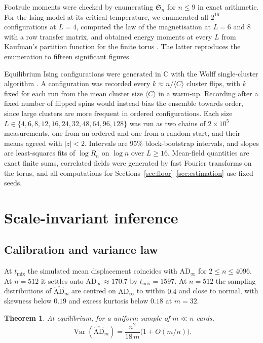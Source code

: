 \documentclass[ba,preprint]{imsart}
\theoremstyle{plain}
\newtheorem{theorem}{Theorem}[section]
\theoremstyle{definition}
\newcommand{\Var}{\operatorname{Var}}
\newcommand{\AD}{\mathrm{AD}}
\newcommand{\ADh}{\widehat{\mathrm{AD}}}
\newcommand{\Sym}{\mathfrak{S}}
\begin{document}
Footrule moments were checked by enumerating $\Sym_n$ for $n\le9$ in exact arithmetic. For the Ising model at its critical temperature, we enumerated all $2^{16}$ configurations at $L=4$, computed the law of the magnetisation at $L=6$ and $8$ with a row transfer matrix, and obtained energy moments at every $L$ from Kaufman's partition function for the finite torus \citep{FerdinandFisher1969,Kaufman1949}. The latter reproduces the enumeration to fifteen significant figures.

Equilibrium Ising configurations were generated in C with the Wolff single-cluster algorithm \citep{Wolff1989}. A configuration was recorded every $k\approx n/\langle C\rangle$ cluster flips, with $k$ fixed for each run from the mean cluster size $\langle C\rangle$ in a warm-up. Recording after a fixed number of flipped spins would instead bias the ensemble towards order, since large clusters are more frequent in ordered configurations. Each size $L\in\{4,6,8,12,16,24,32,48,64,96,128\}$ was run as two chains of $2\times10^5$ measurements, one from an ordered and one from a random start, and their means agreed with $|z|<2$. Intervals are 95\% block-bootstrap intervals, and slopes are least-squares fits of $\log R_n$ on $\log n$ over $L\ge16$. Mean-field quantities are exact finite sums, correlated fields were generated by fast Fourier transforms on the torus, and all computations for Sections~\ref{sec:floor}--\ref{sec:estimation} use fixed seeds.

\section{Scale-invariant inference}\label{sec:scale}

\subsection{Calibration and variance law}

At $t_{\mathrm{mix}}$ the simulated mean displacement coincides with $\AD_\infty$ for $2\le n\le4096$. At $n=512$ it settles onto $\AD_\infty\approx170.7$ by $t_{\mathrm{mix}}=1597$. At $n=512$ the sampling distributions of $\ADh_m$ are centred on $\AD_\infty$ to within $0.4$ and close to normal, with skewness below $0.19$ and excess kurtosis below $0.18$ at $m=32$.

\begin{theorem}\label{thm:variance}
At equilibrium, for a uniform sample of $m\ll n$ cards,
\begin{equation}\label{eq:variance}
\Var(\ADh_m)=\frac{n^2}{18\,m}\bigl(1+O(m/n)\bigr).
\end{equation}
\end{theorem}
\end{document}
